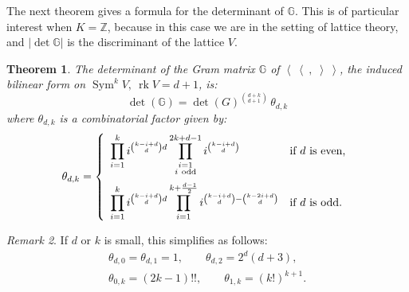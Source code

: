\documentclass{amsart}
\DeclareMathOperator{\rank}{rk}
\DeclareMathOperator{\Sym}{Sym}
\newcommand{\bra}{\left<\!\!\!\:\left<}
\newcommand{\ket}{\right>\!\!\!\:\right>}
\newcommand{\G}{\mathbb{G}}
\newcommand{\Z}{\mathbb{Z}}
\theoremstyle{plain}
\newtheorem{theorem}{Theorem}[section]
\theoremstyle{definition}
\theoremstyle{remark}
\newtheorem{remark}[theorem]{Remark}
\begin{document}
The next theorem gives a formula for the determinant of $\G$. This is of particular interest when $K=\Z$, because in this case we are in the setting of lattice theory, and $|\det \G|$ is the discriminant of the lattice $V$.
\begin{theorem} \label{maintheorem}
The determinant of the Gram matrix $\G$ of $\bra\ ,\;\ket$, the induced bilinear form on $\Sym^kV,\ \rank V = d\!+\!1$, is:
\begin{equation}\label{maintheorem1}
\det(\G)= \det(G)^{\binom{d+k}{d+1}}\,\theta_{d,k}
\end{equation}
where $\theta_{d,k}$ is a combinatorial factor given by:
\begin{equation} \label{thetaDef}
\theta_{d,k} = \left\{
 \begin{array}{*2{l}p{5cm}}
 \displaystyle\prod_{i=1}^k i^{\binom{k-i+d}{d}d}\prod_{\substack{i=1 \\ i\ \text{odd}\\\ }}^{2k+d-1}i^{\binom{k-i+d}{d}} &\text{if }d\text{ is even}, \\
 \displaystyle\prod_{i=1}^k i^{\binom{k-i+d}{d}d}\prod_{i=1}^{k+\frac{d-1}{2}} i^{\binom{k-i+d}{d} - \binom{k-2i+d}{d}} &\text{if }d\text{ is odd}.
\end{array}
\right.
\end{equation}
\end{theorem}
\begin{remark} If $d$ or $k$ is small, this simplifies as follows:
\begin{gather*}
\theta_{d,0}=\theta_{d,1} =1,\qquad \theta_{d,2} = 2^{d}(d+3), \\
\theta_{0,k} = (2k-1)!!, \qquad \theta_{1,k} = (k!)^{k+1}.
\end{gather*}
\end{remark}
\end{document}
